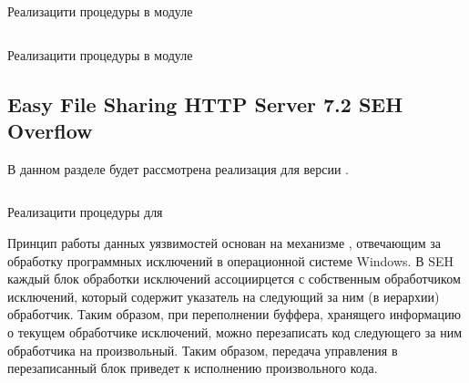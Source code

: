 \begin{listing}[H]
    \inputminted[firstline=60, lastline=100]{ruby}{resources/exploits/00_vsftpd}
    \caption{Реализацити процедуры  в модуле }
    \label{lst:vsftpd-exploit-src}
\end{listing}

\begin{listing}[H]
    \inputminted[firstline=102, lastline=116]{ruby}{resources/exploits/00_vsftpd}
    \caption{Реализацити процедуры  в модуле }
    \label{lst:vsftpd-handle-backdoor-src}
\end{listing}

\subsection{Easy File Sharing HTTP Server 7.2 SEH Overflow}

В данном разделе будет рассмотрена реализация  для  версии . 

\begin{listing}[H]
    \inputminted[firstline=54, lastline=70]{ruby}{resources/exploits/01_easy_file_sharing}
    \caption{Реализацити процедуры  для }
    \label{lst:efshttps-exploit-src}
\end{listing}

Принцип работы данных уязвимостей основан на механизме  , отвечающим за обработку программных исключений в операционной системе Windows. В SEH каждый блок обработки исключений 
ассоциирцется с собственным обработчиком исключений, который содержит указатель на следующий за ним (в иерархии) обработчик. Таким образом, при переполнении буффера, хранящего информацию о текущем обработчике 
исключений, можно перезаписать код следующего за ним обработчика на произвольный. Таким образом, передача управления в перезаписанный блок приведет к исполнению произвольного кода. 

